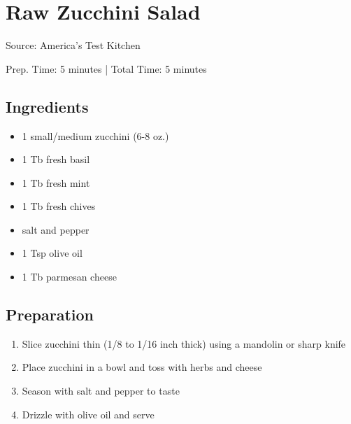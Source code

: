 \section{Raw Zucchini Salad}

Source: America's Test Kitchen

\begin{center}
Prep. Time: 5 minutes |
Total Time: 5 minutes
\end{center}

\subsection{Ingredients}
\begin{multicols}{2}
\begin{itemize}
    \item 1 small/medium zucchini (6-8 oz.)
    \item 1 Tb fresh basil
    \item 1 Tb fresh mint
    \item 1 Tb fresh chives
    \item salt and pepper
    \item 1 Tsp olive oil
    \item 1 Tb parmesan cheese
\end{itemize}
\end{multicols}

\subsection{Preparation}
\begin{enumerate}
    \item Slice zucchini thin (1/8 to 1/16 inch thick) using a mandolin or sharp knife
    \item Place zucchini in a bowl and toss with herbs and cheese
    \item Season with salt and pepper to taste
    \item Drizzle with olive oil and serve
\end{enumerate}

